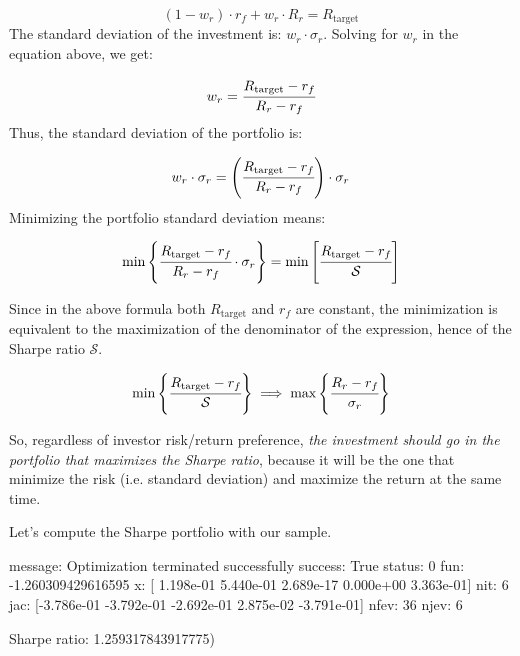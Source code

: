 \begin{equation*} 
(1 - w_r)\cdot r_f + w_r\cdot R_r =R_\textrm{target} 
\end{equation*}
\noindent
The standard deviation of the investment is: \(w_r\cdot \sigma_r\). Solving for \(w_r\) in the equation above, we get:

\begin{equation*} 
	w_r = \cfrac{R_\textrm{target} - r_f}{R_r - r_f} 
\end{equation*}
Thus, the standard deviation of the portfolio is:

\begin{equation*} 
w_r\cdot \sigma_r = \left(\cfrac{R_\textrm{target} - r_f}{R_r - r_f}\right)\cdot \sigma_r 
\end{equation*}
Minimizing the portfolio standard deviation means:

\begin{equation} 
\textrm{min}\left\{\cfrac{R_\textrm{target} - r_f}{R_r - r_f}\cdot \sigma_r\right\} = \textrm{min}\left[\cfrac{R_\textrm{target} - r_f}{\mathcal{S}}\right]
\end{equation}

Since in the above formula both $R_{\textrm{target}}$ and $r_f$ are constant, the minimization is equivalent to the maximization of the denominator of the expression, hence of the Sharpe ratio $\mathcal{S}$.

\begin{equation} 
\textrm{min}\left\{\cfrac{R_\textrm{target} - r_f}{\mathcal{S}}\right\}
\implies\textrm{max}\left\{\cfrac{R_r - r_f}{\sigma_r}\right\}
\end{equation}

So, regardless of investor risk/return preference, \emph{the investment should go in the portfolio that maximizes the Sharpe ratio}, because it will be the one that minimize the risk (i.e. standard deviation) and maximize the return at the same time.

Let's compute the Sharpe portfolio with our sample.


\begin{ioutput}
 message: Optimization terminated successfully
 success: True
  status: 0
     fun: -1.260309429616595
       x: [ 1.198e-01  5.440e-01  2.689e-17  0.000e+00  3.363e-01]
     nit: 6
     jac: [-3.786e-01 -3.792e-01 -2.692e-01  2.875e-02 -3.791e-01]
    nfev: 36
    njev: 6	

Sharpe ratio:  1.259317843917775)
\end{ioutput}

